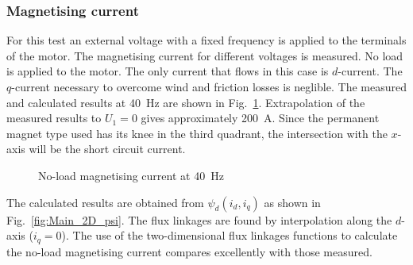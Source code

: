 \subsubsection{Magnetising current}
For this test an external voltage with a fixed frequency is applied to the terminals of the motor. The magnetising current for different voltages is measured. No load is applied to the motor. The only current that flows in this case is $d$-current. The $q$-current necessary to overcome wind and friction losses is neglible. The measured and calculated results at \SI{40}{Hz} are shown in Fig.~\ref{fig:magnetising_current}. Extrapolation of the measured results to $U_1=0$ gives approximately \SI{200}{A}. Since the permanent magnet type used has its knee in the third quadrant, the intersection with the $x$-axis will be the short circuit current.    
\begin{figure}[htbp]
  \centering
    
  \caption{No-load magnetising current at \SI{40}{Hz}}
  \label{fig:magnetising_current}
\end{figure}

The calculated results are obtained from $\psi_d(i_d,i_q)$ as shown in Fig.~\ref{fig:Main_2D_psi}. The flux linkages are found by interpolation along the $d$-axis ($i_q=0$). The use of the two-dimensional flux linkages functions to calculate the no-load magnetising current compares excellently with those measured.  

